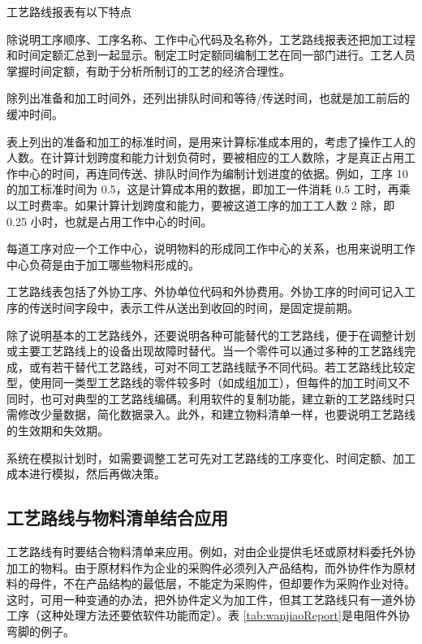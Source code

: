     工艺路线报表有以下特点

    \begin{enumerate.zh}
        \item 除说明工序顺序、工序名称、工作中心代码及名称外，工艺路线报表还把加工过程和时间定额汇总到一起显示。制定工时定额同编制工艺在同一部门进行。工艺人员掌握时间定额，有助于分析所制订的工艺的经济合理性。

        \item 除列出准备和加工时间外，还列出排队时间和等待/传送时间，也就是加工前后的缓冲时间。

        \item 表上列出的准备和加工的标准时间，是用来计算标准成本用的，考虑了操作工人的人数。在计算计划跨度和能力计划负荷时，要被相应的工人数除，才是真正占用工作中心的时间，再连同传送、排队时间作为编制计划进度的依据。例如，工序 10 的加工标准时间为 0.5，这是计算成本用的数据，即加工一件消耗 0.5 工时，再乘以工时费率。如果计算计划跨度和能力，要被这道工序的加工工人数 2 除，即 0.25 小时，也就是占用工作中心的时间。

        \item 每道工序对应一个工作中心，说明物料的形成同工作中心的关系，也用来说明工作中心负荷是由于加工哪些物料形成的。

        \item 工艺路线表包括了外协工序、外协单位代码和外协费用。外协工序的时间可记入工序的传送时间字段中，表示工件从送出到收回的时间，是固定提前期。

        \item  除了说明基本的工艺路线外，还要说明各种可能替代的工艺路线，便于在调整计划或主要工艺路线上的设备出现故障时替代。当一个零件可以通过多种的工艺路线完成，或有若干替代工艺路线，可对不同工艺路线赋予不同代码。若工艺路线比较定型，使用同一类型工艺路线的零件较多时（如成组加工），但每件的加工时间又不同时，也可对典型的工艺路线编碼。利用软件的复制功能，建立新的工艺路线时只需修改少量数据，简化数据录入。此外，和建立物料清单一样，也要说明工艺路线的生效期和失效期。

       \item 系统在模拟计划时，如需要调整工艺可先对工艺路线的工序变化、时间定额、加工成本进行模拟，然后再做决策。
    \end{enumerate.zh}

\subsection {工艺路线与物料清单结合应用}

    工艺路线有时要结合物料清单来应用。例如，对由企业提供毛坯或原材料委托外协加工的物料。由于原材料作为企业的采购件必须列入产品结构，而外协件作为原材料的母件，不在产品结构的最低层，不能定为采购件，但却要作为采购作业对待。 这时，可用一种变通的办法，把外协件定义为加工件，但其工艺路线只有一道外协工序（这种处理方法还要依软件功能而定）。表 \ref{tab:wanjiaoReport}是电阻件外协弯脚的例子。

